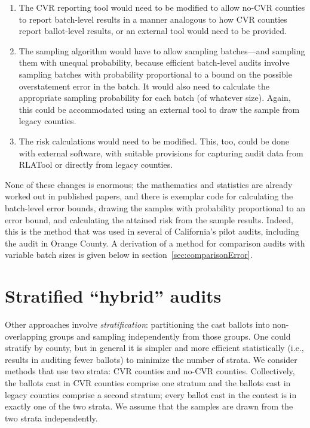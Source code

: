 \documentclass[12pt]{article}
\begin{document}
\begin{enumerate}

  \item The CVR reporting tool would need to be modified to allow no-CVR counties to
report batch-level results in a manner analogous to how CVR counties report
ballot-level results, or an external tool would need to be provided.

  \item The sampling
algorithm would have to allow sampling batches---and sampling them with unequal probability,
because efficient batch-level audits involve sampling batches with probability proportional
to a bound on the possible overstatement error in the batch.
It would also need to calculate the appropriate sampling probability for each batch (of whatever size).
Again, this could be accommodated using an external tool to draw the sample from legacy counties.

  \item The risk calculations would need to be modified. 
This, too, could be done with external software, with suitable provisions for capturing audit data
from RLATool or directly from legacy counties.
\end{enumerate}

None of these changes is enormous; the mathematics and statistics are already worked out
in published papers, and there is exemplar code for calculating the
batch-level error bounds, drawing the samples with probability proportional to an
error bound, and calculating the attained risk from the sample results.
Indeed, this is the method that was used in several of California's pilot audits,
including the audit in Orange County.
A derivation of a method for comparison audits with variable batch sizes is given below
in section~\ref{sec:comparisonError}.

\section{Stratified ``hybrid'' audits} \label{sec:hybrid}

Other approaches involve \emph{stratification}: partitioning the cast ballots
into non-overlapping groups and sampling independently from those groups.
One could stratify by county, but in general it is simpler and more efficient
statistically (i.e., results in auditing fewer ballots) to minimize the number of strata.
We consider methods that use two strata: CVR counties and no-CVR counties. 
Collectively, the ballots cast in CVR counties comprise one stratum and the ballots cast in 
legacy counties comprise a second stratum; every ballot cast in the contest is in 
exactly one of the two strata. 
We assume that the samples are drawn from the
two strata independently.
\end{document}

